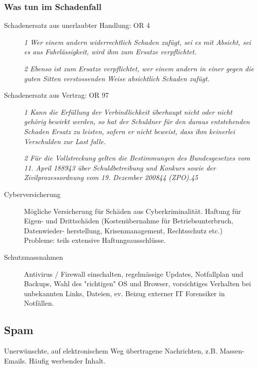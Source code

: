 \subsubsection*{Was tun im Schadenfall}
\begin{description}
  \item[Schadenersatz aus unerlaubter Handlung: OR 4]

  \textit{1 Wer einem andern widerrechtlich Schaden zufügt, sei es mit Absicht, sei es aus Fahrlässigkeit, wird ihm zum Ersatze verpflichtet.}
  
  \textit{2 Ebenso ist zum Ersatze verpflichtet, wer einem andern in einer gegen die guten Sitten verstossenden Weise absichtlich Schaden zufügt.}
  \vspace{3mm}
  
  \item[Schadenersatz aus Vertrag: OR 97]

  \textit{1 Kann die Erfüllung der Verbindlichkeit überhaupt nicht oder nicht gehörig bewirkt werden, so hat der Schuldner für den daraus entstehenden Schaden Ersatz zu leisten, sofern er nicht beweist, dass ihm keinerlei Verschulden zur Last falle.}

  \textit{2 Für die Vollstreckung gelten die Bestimmungen des Bundesgesetzes vom 11. April 188943 über Schuldbetreibung und Konkurs sowie der Zivilprozessordnung vom 19. Dezember 200844 (ZPO).45}
  \item[Cyberversicherung] Mögliche Versicherung für Schäden aus Cyberkriminalität. Haftung für Eigen- und Drittschäden (Kostenübernahme für Betriebsunterbruch, Datenwieder-
herstellung, Krisenmanagement, Rechtsschutz etc.) Probleme: teils extensive Haftungsausschlüsse.
  \item[Schutzmassnahmen] Antivirus / Firewall einschalten, regelmässige Updates, Notfallplan und Backups, Wahl des "richtigen" OS und Browser, vorsichtiges Verhalten bei unbekannten Links, Dateien, ev. Beizug externer IT Forensiker in Notfällen.
\end{description}

\subsection{Spam}
Unerwünschte, auf elektronischem Weg übertragene Nachrichten, z.B. Massen-Emails. Häufig werbender Inhalt.

